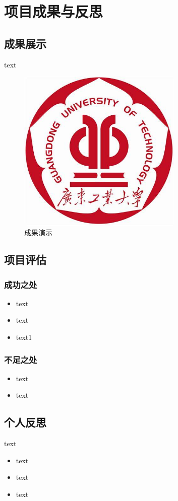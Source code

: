 
\chapter{项目成果与反思}

\section{成果展示}
text
\begin{figure}[h]
    \centering
    \includegraphics[width=0.7\textwidth]{figures/logo.png}
    \caption{成果演示}
\end{figure}
\section{项目评估}

\subsection{成功之处}

\begin{itemize}
    \item text
    \item text
    \item text1
\end{itemize}

\subsection{不足之处}
\begin{itemize}
    \item text
    \item text
\end{itemize}

\section{个人反思}
text
\begin{itemize}
    \item text
    \item text
    \item text
\end{itemize}